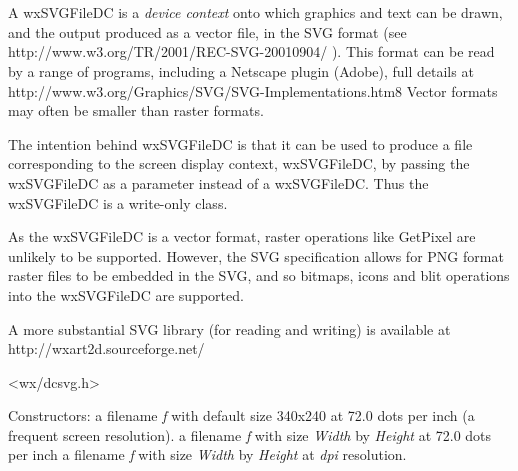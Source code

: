 \section{}\label{wxsvgfiledc}

A wxSVGFileDC is a {\it device context} onto which graphics and text can be drawn, and the output
produced as a vector file, in the SVG format (see http://www.w3.org/TR/2001/REC-SVG-20010904/ ).
This format can be read by a range of programs, including a Netscape plugin (Adobe), full details at 
http://www.w3.org/Graphics/SVG/SVG-Implementations.htm8 Vector formats may often be smaller 
than raster formats.

The intention behind wxSVGFileDC is that it can be used to produce a file corresponding 
to the screen display context, wxSVGFileDC, by passing the wxSVGFileDC as a parameter instead of a wxSVGFileDC. Thus
the wxSVGFileDC is a write-only class.

As the wxSVGFileDC is a vector format, raster operations like GetPixel are unlikely to be supported.
However, the SVG specification allows for PNG format raster files to be embedded in the SVG, and so 
bitmaps, icons and blit operations into the wxSVGFileDC are supported.

A more substantial SVG library (for reading and writing) is available at 
http://wxart2d.sourceforge.net/




<wx/dcsvg.h>







\label{wxsvgfiledcctor}




Constructors: 
a filename {\it f} with default size 340x240 at 72.0 dots per inch (a frequent screen resolution).
a filename {\it f} with size {\it Width} by {\it Height} at 72.0 dots per inch 
a filename {\it f} with size {\it Width} by {\it Height} at {\it dpi} resolution.

